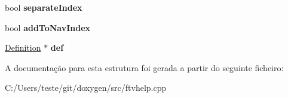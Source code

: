 \begin{DoxyCompactItemize}
\item 
\hypertarget{struct_f_t_v_node_ab20ebfc443f60ac4be46876f85890516}{bool {\bfseries separate\-Index}}\label{struct_f_t_v_node_ab20ebfc443f60ac4be46876f85890516}

\item 
\hypertarget{struct_f_t_v_node_a8a22df0d0d08ee0413d3058d6e59ea6e}{bool {\bfseries add\-To\-Nav\-Index}}\label{struct_f_t_v_node_a8a22df0d0d08ee0413d3058d6e59ea6e}

\item 
\hypertarget{struct_f_t_v_node_a452d54a1b171236a489d68f123081e38}{\hyperlink{class_definition}{Definition} $\ast$ {\bfseries def}}\label{struct_f_t_v_node_a452d54a1b171236a489d68f123081e38}

\end{DoxyCompactItemize}


A documentação para esta estrutura foi gerada a partir do seguinte ficheiro\-:\begin{DoxyCompactItemize}
\item 
C\-:/\-Users/teste/git/doxygen/src/ftvhelp.\-cpp\end{DoxyCompactItemize}
